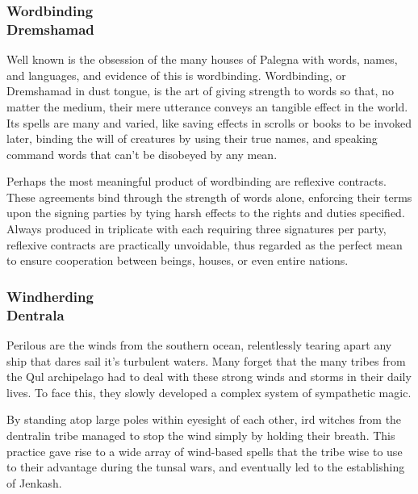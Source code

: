 \subsubsection{Wordbinding\\ \small{Dremshamad}}
Well known is the obsession of the many houses of Palegna with words, names, and languages, and evidence of this is wordbinding.
Wordbinding, or Dremshamad in dust tongue, is the art of giving strength to words so that, no matter the medium, their mere utterance conveys an tangible effect in the world.
Its spells are many and varied, like saving effects in scrolls or books to be invoked later, binding the will of creatures by using their true names, and speaking command words that can't be disobeyed by any mean.

Perhaps the most meaningful product of wordbinding are reflexive contracts.
These agreements bind through the strength of words alone, enforcing their terms upon the signing parties by tying harsh effects to the rights and duties specified.
Always produced in triplicate with each requiring three signatures per party, reflexive contracts are practically unvoidable, thus regarded as the perfect mean to ensure cooperation between beings, houses, or even entire nations.



\subsubsection{Windherding\\ \small{Dentrala}}
Perilous are the winds from the southern ocean, relentlessly tearing apart any ship that dares sail it's turbulent waters.
Many forget that the many tribes from the Qul archipelago had to deal with these strong winds and storms in their daily lives.
To face this, they slowly developed a complex system of sympathetic magic.

By standing atop large poles within eyesight of each other, ird witches from the dentralin tribe managed to stop the wind simply by holding their breath.
This practice gave rise to a wide array of wind-based spells that the tribe wise to use to their advantage during the tunsal wars, and eventually led to the establishing of Jenkash.

